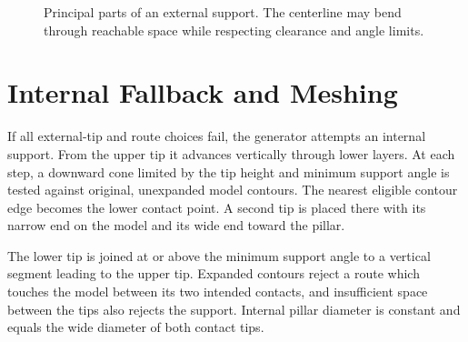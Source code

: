 \begin{figure}[htbp]
    \centering
    \caption{Principal parts of an external support. The centerline may bend
    through reachable space while respecting clearance and angle limits.}
\end{figure}

\section{Internal Fallback and Meshing}

If all external-tip and route choices fail, the generator attempts an internal
support. From the upper tip it advances vertically through lower layers. At
each step, a downward cone limited by the tip height and minimum support angle
is tested against original, unexpanded model contours. The nearest eligible
contour edge becomes the lower contact point. A second tip is placed there
with its narrow end on the model and its wide end toward the pillar.

The lower tip is joined at or above the minimum support angle to a vertical
segment leading to the upper tip. Expanded contours reject a route which
touches the model between its two intended contacts, and insufficient space
between the tips also rejects the support. Internal pillar diameter is
constant and equals the wide diameter of both contact tips.

